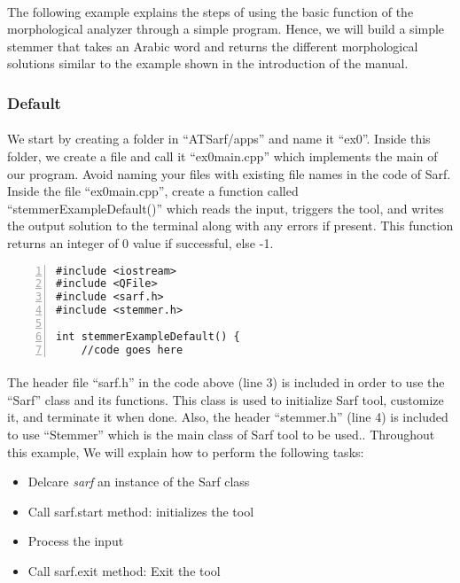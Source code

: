 \documentclass{article}
\begin{document}
\paragraph{}
The following example explains the steps of using the basic function of the morphological analyzer through a simple program. Hence, we will build a simple stemmer that takes an Arabic word and returns the different morphological solutions similar to the example shown in the introduction of the manual.

\subsubsection{Default}
\label{subsubsec:default}

\paragraph{}
We start by creating a folder in ``ATSarf/apps'' and name it ``ex0''. Inside this folder, we create a file and call it ``ex0main.cpp'' which implements the main of our program. Avoid naming your files with existing file names in the code of Sarf. Inside the file ``ex0main.cpp'', create a function called ``stemmerExampleDefault()'' which reads the input, triggers the tool, and writes the output solution to the terminal along with any errors if present. This function returns an integer of 0 value if successful, else -1.

\begin{Verbatim}[numbers=left]
#include <iostream>
#include <QFile>
#include <sarf.h>
#include <stemmer.h>

int stemmerExampleDefault() {
	//code goes here
\end{Verbatim}

\paragraph{}
The header file ``sarf.h'' in the code above (line 3) is included in order to use the ``Sarf'' class and its functions. This class is used to initialize Sarf tool, customize it, and terminate it when done. Also, the header ``stemmer.h'' (line 4) is included to use ``Stemmer'' which is the main class of Sarf tool to be used.. Throughout this example, We will explain how to perform the following tasks:

\begin{itemize}
\item Delcare {\em sarf}  an instance of the Sarf class
\item Call {sarf.start } method: initializes the tool
\item Process the input
\item Call {sarf.exit } method: Exit the tool
\end{itemize}
\end{document}
